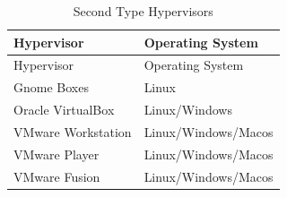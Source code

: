 \documentclass[
  14pt,
  english,
  a4paper,
]{scrreprt}
\begin{document}
\hypertarget{tbl:type2_hyp}{}
\begin{longtable}[]{@{}ll@{}}
\caption{\label{tbl:type2_hyp}Second Type Hypervisors}\tabularnewline
\toprule
\begin{minipage}[b]{0.27\columnwidth}\raggedright
Hypervisor\strut
\end{minipage} & \begin{minipage}[b]{0.29\columnwidth}\raggedright
Operating System\strut
\end{minipage}\tabularnewline
\midrule
\endfirsthead
\toprule
\begin{minipage}[b]{0.27\columnwidth}\raggedright
Hypervisor\strut
\end{minipage} & \begin{minipage}[b]{0.29\columnwidth}\raggedright
Operating System\strut
\end{minipage}\tabularnewline
\midrule
\endhead
\begin{minipage}[t]{0.27\columnwidth}\raggedright
Gnome Boxes\strut
\end{minipage} & \begin{minipage}[t]{0.29\columnwidth}\raggedright
Linux\strut
\end{minipage}\tabularnewline
\begin{minipage}[t]{0.27\columnwidth}\raggedright
Oracle VirtualBox\strut
\end{minipage} & \begin{minipage}[t]{0.29\columnwidth}\raggedright
Linux/Windows\strut
\end{minipage}\tabularnewline
\begin{minipage}[t]{0.27\columnwidth}\raggedright
VMware Workstation\strut
\end{minipage} & \begin{minipage}[t]{0.29\columnwidth}\raggedright
Linux/Windows/Macos\strut
\end{minipage}\tabularnewline
\begin{minipage}[t]{0.27\columnwidth}\raggedright
VMware Player\strut
\end{minipage} & \begin{minipage}[t]{0.29\columnwidth}\raggedright
Linux/Windows/Macos\strut
\end{minipage}\tabularnewline
\begin{minipage}[t]{0.27\columnwidth}\raggedright
VMware Fusion\strut
\end{minipage} & \begin{minipage}[t]{0.29\columnwidth}\raggedright
Linux/Windows/Macos\strut
\end{minipage}\tabularnewline
\bottomrule
\end{longtable}
\end{document}
